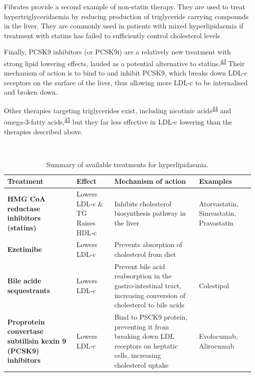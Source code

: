 \documentclass[a4paper, twoside]{templates/ociamthesis}
\begin{document}
Fibrates provide a second example of non-statin therapy. They are used to treat hypertriglyceridaemia by reducing production of triglyceride carrying compounds in the liver. They are commonly used in patients with mixed hyperlipidaemia if treatment with statins has failed to sufficiently control cholesterol levels.

Finally, PCSK9 inhibitors (or PCSK9i) are a relatively new treatment with strong lipid lowering effects, lauded as a potential alternative to statins.\textsuperscript{\protect\hyperlink{ref-chaudhary2017}{43}} Their mechanism of action is to bind to and inhibit PCSK9, which breaks down LDL-c receptors on the surface of the liver, thus allowing more LDL-c to be internalised and broken down.

Other therapies targeting triglycerides exist, including nicotinic acids\textsuperscript{\protect\hyperlink{ref-mckenney2004}{44}} and omega-3-fatty acids,\textsuperscript{\protect\hyperlink{ref-skulas2019}{45}} but they far less effective in LDL-c lowering than the therapies described above.

~



\begin{table}[H]

\caption{\label{tab:lipidTreatments-table}Summary of available treatments for hyperlipidaemia.}
\centering
\begin{tabular}[t]{>{\raggedright\arraybackslash}p{8em}>{\raggedright\arraybackslash}p{8em}>{\raggedright\arraybackslash}p{8em}>{\raggedright\arraybackslash}p{8em}}
\toprule
\textbf{Treatment} & \textbf{Effect} & \textbf{Mechanism of action} & \textbf{Examples}\\
\midrule
\textbf{HMG CoA reductase inhibitors (statins)} & Lowers LDL-c \& TG \newline Raises HDL-c & Inhibits cholesterol biosynthesis pathway in the liver & Atorvastatin, \newline Simvastatin, \newline Pravastatin\\
\midrule
\textbf{Ezetimibe} & Lowers LDL-c & Prevents absorption of cholesterol from diet & \\
\midrule
\textbf{Bile acide sequestrants} & Lowers LDL-c & Prevent bile acid reabsorption in the gastro-intestinal tract, increasing conversion of cholesterol to bile acids & Colestipol\\
\midrule
\textbf{Proprotein convertase subtilisin kexin 9 (PCSK9) inhibitors} & Lowers LDL-c & Bind to PSCK9 protein, preventing it from breaking down LDL receptors on heptatic cells, increasing cholesterol uptake & Evolocumab, \newline Alirocumab\\
\bottomrule
\end{tabular}
\end{table}
\end{document}
